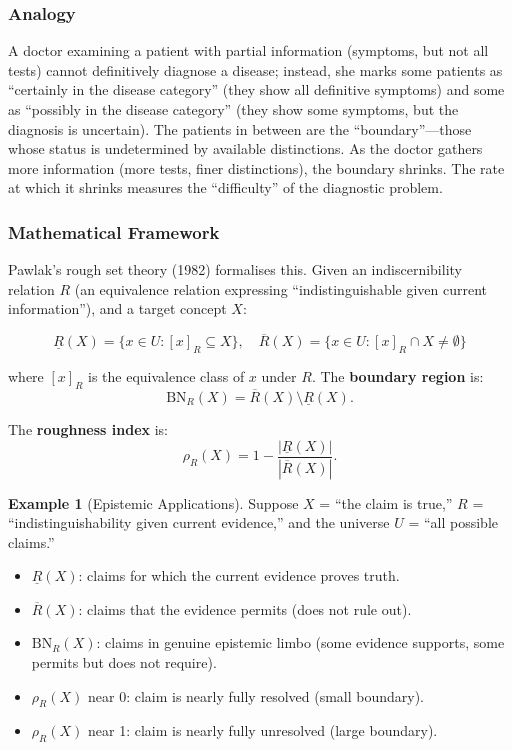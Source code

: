 \documentclass[11pt,letterpaper]{article}
\theoremstyle{definition}
\newtheorem{example}{Example}[section]
\theoremstyle{remark}
\begin{document}
\subsubsection*{Analogy}

A doctor examining a patient with partial information (symptoms, but not all tests) cannot definitively diagnose a disease; instead, she marks some patients as ``certainly in the disease category'' (they show all definitive symptoms) and some as ``possibly in the disease category'' (they show some symptoms, but the diagnosis is uncertain). The patients in between are the ``boundary''---those whose status is undetermined by available distinctions. As the doctor gathers more information (more tests, finer distinctions), the boundary shrinks. The rate at which it shrinks measures the ``difficulty'' of the diagnostic problem.

\subsubsection*{Mathematical Framework}

Pawlak's rough set theory (1982) formalises this. Given an indiscernibility relation $R$ (an equivalence relation expressing ``indistinguishable given current information''), and a target concept $X$:

\[
\underline{R}(X) = \{x \in U : [x]_R \subseteq X\}, \quad \overline{R}(X) = \{x \in U : [x]_R \cap X \neq \emptyset\}
\]

where $[x]_R$ is the equivalence class of $x$ under $R$. The \textbf{boundary region} is:
\[
\mathrm{BN}_R(X) = \overline{R}(X) \setminus \underline{R}(X).
\]

The \textbf{roughness index} is:
\[
\rho_R(X) = 1 - \frac{|\underline{R}(X)|}{|\overline{R}(X)|}.
\]

\begin{example}[Epistemic Applications]
Suppose $X$ = ``the claim is true,'' $R$ = ``indistinguishability given current evidence,'' and the universe $U$ = ``all possible claims.''
\begin{itemize}
\item $\underline{R}(X)$: claims for which the current evidence proves truth.
\item $\overline{R}(X)$: claims that the evidence permits (does not rule out).
\item $\mathrm{BN}_R(X)$: claims in genuine epistemic limbo (some evidence supports, some permits but does not require).
\item $\rho_R(X)$ near 0: claim is nearly fully resolved (small boundary).
\item $\rho_R(X)$ near 1: claim is nearly fully unresolved (large boundary).
\end{itemize}
\end{example}
\end{document}
